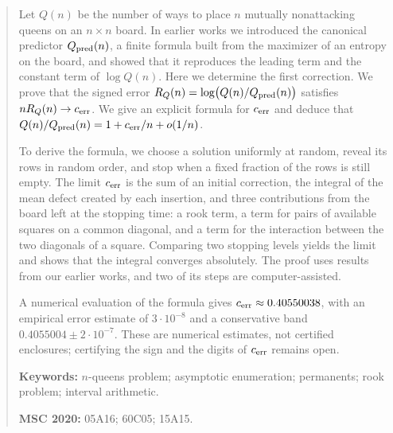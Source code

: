 \begin{abstract}\label{sec:resumen}
\noindent Let \(Q(n)\) be the number of ways to place \(n\) mutually nonattacking queens on an \(n\times
n\) board. In earlier works we introduced the canonical predictor \(Q_{\rm pred}(n)\), a finite
formula built from the maximizer of an entropy on the board, and showed that it reproduces the
leading term and the constant term of \(\log Q(n)\). Here we determine the first correction.
We prove that the signed error \(R_Q(n)=\log\bigl(Q(n)/Q_{\rm pred}(n)\bigr)\) satisfies
\(nR_Q(n)\to\cerr\). We give an explicit formula for \(\cerr\) and deduce that
\(Q(n)/Q_{\rm pred}(n)=1+\cerr/n+o(1/n)\).

\smallskip\noindent To derive the formula, we choose a solution uniformly at random, reveal its rows in
random order, and stop when a fixed fraction of the rows is still empty. The limit \(\cerr\) is the sum
of an initial correction, the integral of the mean defect created by each insertion, and three
contributions from the board left at the stopping time: a rook term, a term for pairs of available
squares on a common diagonal, and a term for the interaction between the two diagonals of a square.
Comparing two stopping levels yields the limit and shows that the integral converges absolutely. The
proof uses results from our earlier works, and two of its steps are computer-assisted.

\smallskip\noindent A numerical evaluation of the formula gives \(\cerr\approx0.40550038\), with an
empirical error estimate of \(3\cdot10^{-8}\) and a conservative band \(0.4055004\pm2\cdot10^{-7}\).
These are numerical estimates, not certified enclosures; certifying the sign and the digits of \(\cerr\)
remains open.

\medskip\noindent
\textbf{Keywords:} $n$-queens problem; asymptotic enumeration; permanents; rook problem;
interval arithmetic.

\noindent
\textbf{MSC 2020:} 05A16; 60C05; 15A15.
\end{abstract}

